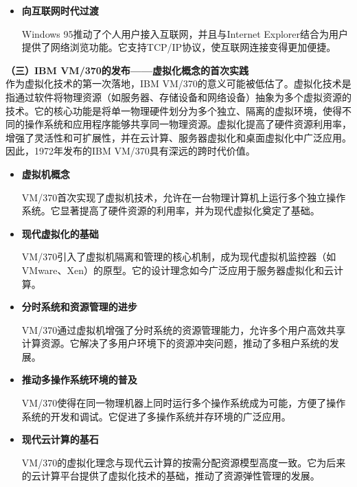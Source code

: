 \documentclass[UTF8]{homework}
\begin{document}
\begin{homeworkProblem}
\begin{itemize}
	\item \textbf{向互联网时代过渡}
	
	Windows 95推动了个人用户接入互联网，并且与Internet Explorer结合为用户提供了网络浏览功能。它支持TCP/IP协议，使互联网连接变得更加便捷。\\
	
\end{itemize}

\textbf{（三）IBM VM/370的发布——虚拟化概念的首次实践}\\

作为虚拟化技术的第一次落地，IBM VM/370的意义可能被低估了。虚拟化技术是指通过软件将物理资源（如服务器、存储设备和网络设备）抽象为多个虚拟资源的技术。它的核心功能是将单一物理硬件划分为多个独立、隔离的虚拟环境，使得不同的操作系统和应用程序能够共享同一物理资源。虚拟化提高了硬件资源利用率，增强了灵活性和可扩展性，并在云计算、服务器虚拟化和桌面虚拟化中广泛应用。因此，1972年发布的IBM VM/370具有深远的跨时代价值。\\

\begin{itemize}
	\item \textbf{虚拟机概念}
	
	VM/370首次实现了虚拟机技术，允许在一台物理计算机上运行多个独立操作系统。它显著提高了硬件资源的利用率，并为现代虚拟化奠定了基础。
	
	\item \textbf{现代虚拟化的基础}
	
	VM/370引入了虚拟机隔离和管理的核心机制，成为现代虚拟机监控器（如VMware、Xen）的原型。它的设计理念如今广泛应用于服务器虚拟化和云计算。
	
	\item \textbf{分时系统和资源管理的进步}
	
	VM/370通过虚拟机增强了分时系统的资源管理能力，允许多个用户高效共享计算资源。它解决了多用户环境下的资源冲突问题，推动了多租户系统的发展。
	
	\item \textbf{推动多操作系统环境的普及}
	
	VM/370使得在同一物理机器上同时运行多个操作系统成为可能，方便了操作系统的开发和调试。它促进了多操作系统并存环境的广泛应用。
	
	\item \textbf{现代云计算的基石}
	
	VM/370的虚拟化理念与现代云计算的按需分配资源模型高度一致。它为后来的云计算平台提供了虚拟化技术的基础，推动了资源弹性管理的发展。\\
	

\end{itemize}
\end{homeworkProblem}
\end{document}
